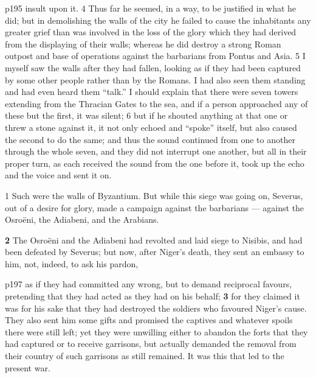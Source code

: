 p195 insult upon it. 4 Thus far he seemed, in a way, to be justified in what he did; but in demolishing the walls of the city he failed to cause the inhabitants any greater grief than was involved in the loss of the glory which they had derived from the displaying of their walls; whereas he did destroy a strong Roman outpost and base of operations against the barbarians from Pontus and Asia. 5 I myself saw the walls after they had fallen, looking as if they had been captured by some other people rather than by the Romans. I had also seen them standing and had even heard them ``talk.'' I should explain that there were seven towers extending from the Thracian Gates to the sea, and if a person approached any of these but the first, it was silent; 6 but if he shouted anything at that one or threw a stone against it, it not only echoed and ``spoke'' itself, but also caused the second to do the same; and thus the sound continued from one to another through the whole seven, and they did not interrupt one another, but all in their proper turn, as each received the sound from the one before it, took up the echo and the voice and sent it on.


1 Such were the walls of Byzantium. But while this siege was going on, Severus, out of a desire for glory, made a campaign against the barbarians \texthebrew{—} against the Osroëni, the Adiabeni, and the Arabians.

\textbf{2} The Osroëni and the Adiabeni had revolted and laid siege to Nisibis, and had been defeated by Severus; but now, after Niger's death, they sent an embassy to him, not, indeed, to ask his pardon,

p197 as if they had committed any wrong, but to demand reciprocal favours, pretending that they had acted as they had on his behalf; \textbf{3} for they claimed it was for his sake that they had destroyed the soldiers who favoured Niger's cause. They also sent him some gifts and promised the captives and whatever spoils there were still left; yet they were unwilling either to abandon the forts that they had captured or to receive garrisons, but actually demanded the removal from their country of such garrisons as still remained. It was this that led to the present war.

